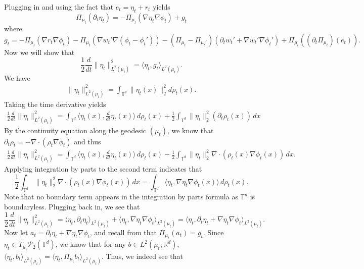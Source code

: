 \documentclass[11pt]{article}
\begin{document}
Plugging in  and using the fact that $e_t = \eta_t + r_t$ yields
\begin{equation}
\Pi_{\mu_t}(\partial_t\eta_t) = -\Pi_{\mu_t}(\nabla \eta_t \nabla \phi_t)  + g_t \label{F_t}
\end{equation}
where
\begin{equation}
g_t = -\Pi_{\mu_t}(\nabla r_t \nabla \phi_t)  - \Pi_{\mu_t}(\nabla w_t' \nabla(\phi_t - \phi_t')) -(\Pi_{\mu_t} - \Pi_{\mu_t'})(\partial_tw_t'  + \nabla w_t'\nabla \phi_t') + \Pi_{\mu_t}((\partial_t\Pi_{\mu_t})(e_t)).
\end{equation}
Now we will show that 
\begin{equation*}
    \frac{1}{2}\frac{d}{dt}\|\eta_t\|_{L^2(\mu_t)}^2 = \langle \eta_t, g_t\rangle_{L^2(\mu_t)}.
\end{equation*}
We have
\begin{align*}
    \|\eta_t\|_{L^2(\mu_t)}^2 = \int_{\mathbb{T}^d}\|\eta_t(x)\|^2_2d\rho_t(x).
\end{align*}
Taking the time derivative yields
\begin{align*}
    \frac{1}{2}\frac{d}{dt}\|\eta_t\|^2_{L^2(\mu_t)} = \int_{\mathbb{T}^d} \langle \eta_t(x), \frac{d}{dt}\eta_t(x)\rangle \,d\rho_t(x) + \frac{1}{2}\int_{\mathbb{T}^d}\|\eta_t\|^2_2 (\partial_t\rho_t(x)) \,dx
\end{align*}
By the continuity equation along the geodesic $(\mu_t)$, we know that $\partial_t\rho_t = -\nabla \cdot(\rho_t\nabla\phi_t)$ and thus
\begin{align*}
    \frac{1}{2}\frac{d}{dt}\|\eta_t\|^2_{L^2(\mu_t)} = \int_{\mathbb{T}^d} \langle \eta_t(x), \frac{d}{dt}\eta_t(x)\rangle \,d\rho_t(x) - \frac{1}{2}\int_{\mathbb{T}^d} \|\eta_t\|^2_2 \nabla \cdot(\rho_t(x)\nabla\phi_t(x)) \,dx.
\end{align*}
Applying integration by parts to the second term indicates that 
\[\frac{1}{2}\int_{\mathbb{T}^d}\|\eta_t\|^2_2 \nabla \cdot(\rho_t(x)\nabla\phi_t(x)) \,dx = \int_{\mathbb{T}^d}\langle\eta_t, \nabla \eta_t\nabla\phi_t(x) \rangle  \, d\rho_t(x).\]
Note that no boundary term appears in the integration by parts formula as $\mathbb{T}^d$ is boundaryless. Plugging back in, we see that 
\[ \frac{1}{2}\frac{d}{dt}\|\eta_t\|_{L^2(\mu_t)}^2 = \langle \eta_t, \partial_t\eta_t\rangle_{L^2(\mu_t)} + 
\langle \eta_t, \nabla \eta_t \nabla \phi_t \rangle_{L^2(\mu_t)} = \langle \eta_t, \partial_t\eta_t +  \nabla \eta_t \nabla \phi_t \rangle_{L^2(\mu_t)}.\]
Now let $a_t = \partial_t\eta_t + \nabla\eta_t\nabla\phi_t$, and recall from  that $\Pi_{\mu_t}(a_t) = g_t$. Since $\eta_t \in T_{\mu_t}\mathcal{P}_2(\mathbb{T}^d)$, we know that for any $b \in L^2(\mu_t; \mathbb{R}^d)$, $\langle \eta_t, b_t\rangle_{L^2(\mu_t)} = \langle \eta_t, \Pi_{\mu_t}b_t\rangle_{L^2(\mu_t)}$. Thus, we indeed see that 
\end{document}
